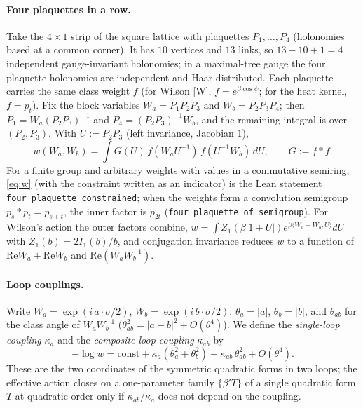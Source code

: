 \documentclass[11pt,a4paper]{article}
\theoremstyle{definition}
\theoremstyle{remark}
\newcommand{\code}[1]{\texttt{#1}}
\begin{document}
\paragraph{Four plaquettes in a row.}
Take the $4\times1$ strip of the square lattice with plaquettes $P_1,\dots,P_4$ (holonomies based at a common corner).
It has $10$ vertices and $13$ links, so $13-10+1=4$ independent gauge-invariant holonomies; in a maximal-tree gauge the four plaquette holonomies are independent and Haar distributed.
Each plaquette carries the same class weight $f$ (for Wilson [W], $f=e^{\beta\cos\psi}$; for the heat kernel, $f=p_t$).
Fix the block variables $W_a=P_1P_2P_3$ and $W_b=P_2P_3P_4$; then $P_1=W_a(P_2P_3)^{-1}$ and $P_4=(P_2P_3)^{-1}W_b$, and the remaining integral is over $(P_2,P_3)$.
With $U:=P_2P_3$ (left invariance, Jacobian $1$),
\begin{equation}\label{eq:w}
w(W_a,W_b)=\int G(U)\,f(W_aU^{-1})\,f(U^{-1}W_b)\,dU,\qquad G:=f*f .
\end{equation}
For a finite group and arbitrary weights with values in a commutative semiring, \eqref{eq:w} (with the constraint written as an indicator) is the Lean statement \code{four\_plaquette\_constrained}; when the weights form a convolution semigroup $p_s*p_t=p_{s+t}$, the inner factor is $p_{2t}$ (\code{four\_plaquette\_of\_semigroup}).
For Wilson's action the outer factors combine, $w=\int Z_1(\beta|1+U|)e^{\beta\langle W_a+W_b,U\rangle}dU$ with $Z_1(b)=2I_1(b)/b$, and conjugation invariance reduces $w$ to a function of $\mathrm{Re}W_a+\mathrm{Re}W_b$ and $\mathrm{Re}(W_aW_b^{-1})$.

\paragraph{Loop couplings.}
Write $W_a=\exp(i\,a\cdot\sigma/2)$, $W_b=\exp(i\,b\cdot\sigma/2)$, $\theta_a=|a|$, $\theta_b=|b|$, and $\theta_{ab}$ for the class angle of $W_aW_b^{-1}$ ($\theta_{ab}^2=|a-b|^2+O(\theta^4)$).
We define the \emph{single-loop coupling} $\kappa_a$ and the \emph{composite-loop coupling} $\kappa_{ab}$ by
\begin{equation}\label{eq:kappa}
-\log w=\mathrm{const}+\kappa_a(\theta_a^2+\theta_b^2)+\kappa_{ab}\,\theta_{ab}^2+O(\theta^4).
\end{equation}
These are the two coordinates of the symmetric quadratic forms in two loops; the effective action closes on a one-parameter family $\{\beta'T\}$ of a single quadratic form $T$ at quadratic order only if $\kappa_{ab}/\kappa_a$ does not depend on the coupling.
\end{document}
